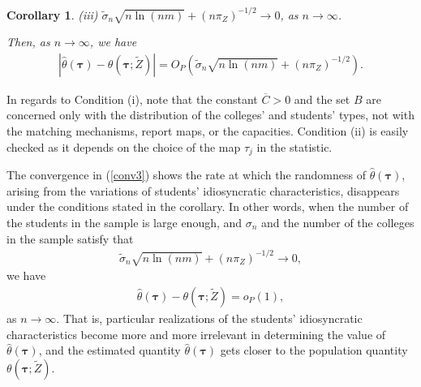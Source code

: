 \documentclass[12pt, fullpage]{amsart}
\makeatletter
\def\subsection{\@startsection{subsection}{2}
	\z@{.5\linespacing\@plus.7\linespacing}{.7\linespacing}{\large}}
\newtheorem{corollary}{Corollary}[section]
\theoremstyle{definition}
\theoremstyle{definition}
\theoremstyle{definition}
\makeatother
\begin{document}
\begin{bibunit}[econometrica]
\begin{corollary}
	(iii) $\tilde \sigma_n \sqrt{n \ln(n m)} + (n \pi_Z)^{-1/2} \rightarrow 0$, as $n \rightarrow \infty$.\medskip

    Then, as $n \rightarrow \infty$, we have
	\begin{align}
		\label{conv3}
		\left|\hat \theta(\boldsymbol{\tau}) - \theta(\boldsymbol{\tau};\tilde Z) \right| = O_P\left( \tilde \sigma_n \sqrt{n \ln(n m)} + (n \pi_Z)^{-1/2} \right).
	\end{align}
\end{corollary}

In regards to Condition (i), note that the constant $\overline C>0$ and the set $B$ are concerned only with the distribution of the colleges' and students' types, not with the matching mechanisms, report maps, or the capacities. Condition (ii) is easily checked as it depends on the choice of the map $\tau_j$ in the statistic. 

The convergence in (\ref{conv3}) shows the rate at which the randomness of $\hat \theta(\boldsymbol{\tau})$, arising from the variations of students' idiosyncratic characteristics, disappears under the conditions stated in the corollary. In other words, when the number of the students in the sample is large enough, and $\sigma_n$ and the number of the colleges in the sample satisfy that
\begin{align}
    \label{cond sigma_n}
    \tilde \sigma_n \sqrt{n \ln(n m)} + (n \pi_Z)^{-1/2} \rightarrow 0,
\end{align}
we have 
\begin{align*}
	\hat \theta(\boldsymbol{\tau}) - \theta(\boldsymbol{\tau};\tilde Z) = o_P(1),
\end{align*}
as $n \rightarrow \infty$. That is, particular realizations of the students' idiosyncratic characteristics become more and more irrelevant in determining the value of $\hat \theta(\boldsymbol{\tau})$, and the estimated quantity $\hat \theta(\boldsymbol{\tau})$ gets closer to the population quantity $\theta(\boldsymbol{\tau};\tilde Z)$.

\subsection{Discussion}
\label{sec:DiscussionPH}


\end{bibunit}
\end{document}
